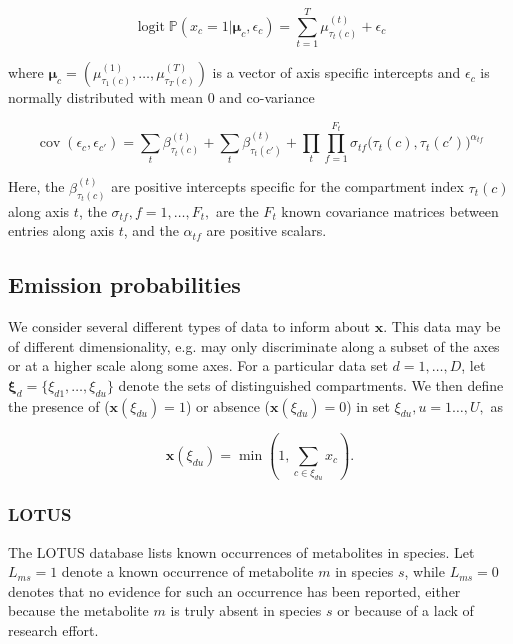 \documentclass[a4paper,10pt]{article}
\DeclareMathOperator{\logit}{logit}
\DeclareMathOperator{\cov}{cov}
\def\P{\mathbb{P}}
\def\x{\boldsymbol{x}}
\def\bmu{\boldsymbol{\mu}}
\def\bxi{\boldsymbol{\xi}}
\begin{document}
\begin{equation}
	\logit \P(x_c=1|\bmu_c, \epsilon_c) = \sum_{t=1}^{T} \mu^{(t)}_{\tau_t(c)} + \epsilon_{c}
\end{equation}

where $\bmu_c=(\mu^{(1)}_{\tau_1(c)}, \ldots, \mu^{(T)}_{\tau_T(c)})$ is a vector of axis specific intercepts and $\epsilon_{c}$ is normally distributed with mean 0 and co-variance

\begin{equation}
	\cov(\epsilon_c, \epsilon_{c'}) = \sum_t \beta^{(t)}_{\tau_t(c)} + \sum_t \beta^{(t)}_{\tau_t(c')} + \prod_t \prod_{f=1}^{F_t} \sigma_{tf}\Big(\tau_t(c), \tau_t(c')\Big)^{\alpha_{tf}}
\end{equation}



Here, the $\beta^{(t)}_{\tau_t(c)}$ are positive intercepts specific for the compartment index $\tau_t(c)$ along axis $t$, the $\sigma_{tf}, f=1, \ldots, F_t,$ are the $F_t$ known covariance matrices between entries along axis $t$, and the $\alpha_{tf}$ are positive scalars.

\subsection{Emission probabilities}

We consider several different types of data to inform about $\x$. This data may be of different dimensionality, e.g. may only discriminate along a subset of the axes or at a higher scale along some axes. For a particular data set $d=1, \ldots, D$, let $\bxi_d=\{\xi_{d1}, \ldots, \xi_{du}\}$ denote the sets of distinguished compartments. We then define the presence of ($\x(\xi_{du})=1$) or absence ($\x(\xi_{du})=0$) in set $\xi_{du}, u=1\ldots,U,$ as

\begin{equation*}
 \x(\xi_{du}) = \min \left(1, \sum_{c \in \xi_{du}} x_c \right).
\end{equation*}


\subsubsection{LOTUS}

 The LOTUS database \cite{rutzLOTUSInitiativeOpen2022} lists known occurrences of metabolites in species. Let $L_{ms} = 1$ denote a known occurrence of metabolite $m$ in species $s$, while $L_{ms}=0$ denotes that no evidence for such an occurrence has been reported, either because the metabolite $m$ is truly absent in species $s$ or because of a lack of research effort.
\end{document}
